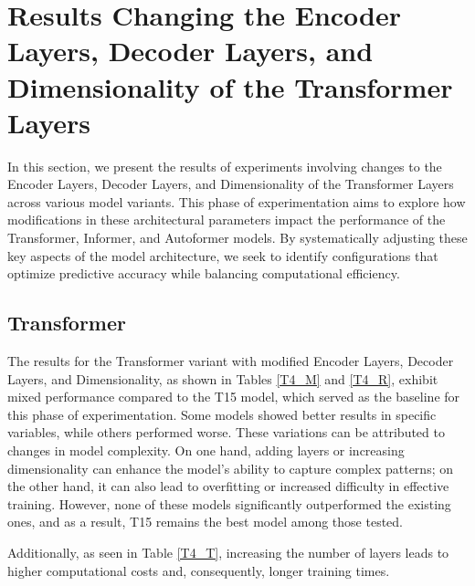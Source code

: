 \section{Results Changing the Encoder Layers, Decoder Layers, and Dimensionality of the Transformer Layers}

In this section, we present the results of experiments involving changes to the Encoder Layers, Decoder Layers, and Dimensionality of the Transformer Layers across various model variants. This phase of experimentation aims to explore how modifications in these architectural parameters impact the performance of the Transformer, Informer, and Autoformer models. By systematically adjusting these key aspects of the model architecture, we seek to identify configurations that optimize predictive accuracy while balancing computational efficiency.

\subsection{Transformer}
The results for the Transformer variant with modified Encoder Layers, Decoder Layers, and Dimensionality, as shown in Tables \ref{T4_M} and \ref{T4_R}, exhibit mixed performance compared to the T15 model, which served as the baseline for this phase of experimentation. Some models showed better results in specific variables, while others performed worse. These variations can be attributed to changes in model complexity. On one hand, adding layers or increasing dimensionality can enhance the model's ability to capture complex patterns; on the other hand, it can also lead to overfitting or increased difficulty in effective training. However, none of these models significantly outperformed the existing ones, and as a result, T15 remains the best model among those tested.

Additionally, as seen in Table \ref{T4_T}, increasing the number of layers leads to higher computational costs and, consequently, longer training times.


